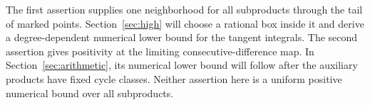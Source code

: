 The first assertion supplies one neighborhood for all subproducts
through the tail of marked points. Section~\ref{sec:high} will choose
a rational box inside it and derive a degree-dependent numerical
lower bound for the tangent integrals. The second assertion gives
positivity at the limiting consecutive-difference map. In
Section~\ref{sec:arithmetic}, its numerical lower bound will follow
after the auxiliary products have fixed cycle classes. Neither
assertion here is a uniform positive numerical bound over all
subproducts.

